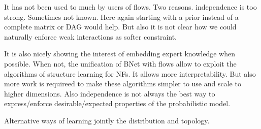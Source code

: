 It has not been used to much by users of flows. Two reasons. independence is too strong. Sometimes not known. Here again starting with a prior instead of a complete matrix or DAG would help. But also it is not clear how we could naturally enforce weak interactions as softer constraint.

It is also nicely showing the interest of embedding expert knowledge when possible. When not, the unification of BNet with flows allow to exploit the algorithms of structure learning for NFs. It allows more interpretability.
But also more work is requireed to make these algorithms simpler to use and scale to higher dimensions. Also independence is not always the best way to express/enforce desirable/expected properties of the probabilistic model.

Alternative ways of learning jointly the distribution and topology.
